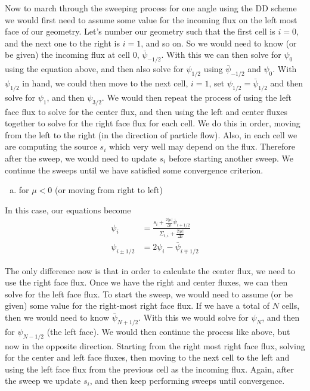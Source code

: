 \documentclass[10pt]{article}
\begin{document}
Now to march through the sweeping process for one angle using the DD scheme we would first need to assume some value for the incoming flux on the left most face of our geometry. Let's number our geometry such that the first cell is $i=0$, and the next one to the right is $i=1$, and so on. So we would need to know (or be given) the incoming flux at cell 0, $\bar{\psi}_{-1/2}$. With this we can then solve for $\psi_0$ using the equation above, and then also solve for $\psi_{1/2}$ using $\bar{\psi}_{-1/2}$ and $\psi_0$. With $\psi_{1/2}$ in hand, we could then move to the next cell, $i=1$, set $\psi_{1/2} = \bar{\psi}_{1/2}$ and then solve for $\psi_1$, and then $\psi_{3/2}$. We would then repeat the process of using the left face flux to solve for the center flux, and then using the left and center fluxes together to solve for the right face flux for each cell. We do this in order, moving from the left to the right (in the direction of particle flow). Also, in each cell we are computing the source $s_i$ which very well may depend on the flux. Therefore after the sweep, we would need to update $s_i$ before starting another sweep. We continue the sweeps until we have satisfied some convergence criterion.

%
%
%

\vspace{40pt}
\begin{enumerate}[(b)]
\item for $\mu < 0$ (or moving from right to left)
\end{enumerate}

In this case, our equations become
%
\begin{align*}
\psi_{i} &= \frac{s_{i} + \frac{2|\mu|}{\Delta i}\bar{\psi}_{i+1/2}}{\Sigma_{t,i} + \frac{2|\mu|}{\Delta i}} \\
\psi_{i\pm1/2} &= 2\psi_{i} - \bar{\psi}_{i\mp1/2}
\end{align*}

The only difference now is that in order to calculate the center flux, we need to use the right face flux. Once we have the right and center fluxes, we can then solve for the left face flux. To start the sweep, we would need to assume (or be given) some value for the right-most right face flux. If we have a total of $N$ cells, then we would need to know $\bar{\psi}_{N+1/2}$. With this we would solve for $\psi_N$, and then for $\psi_{N-1/2}$ (the left face). We would then continue the process like above, but now in the opposite direction. Starting from the right most right face flux, solving for the center and left face fluxes, then moving to the next cell to the left and using the left face flux from the previous cell as the incoming flux. Again, after the sweep we update $s_i$, and then keep performing sweeps until convergence.
\end{document}
